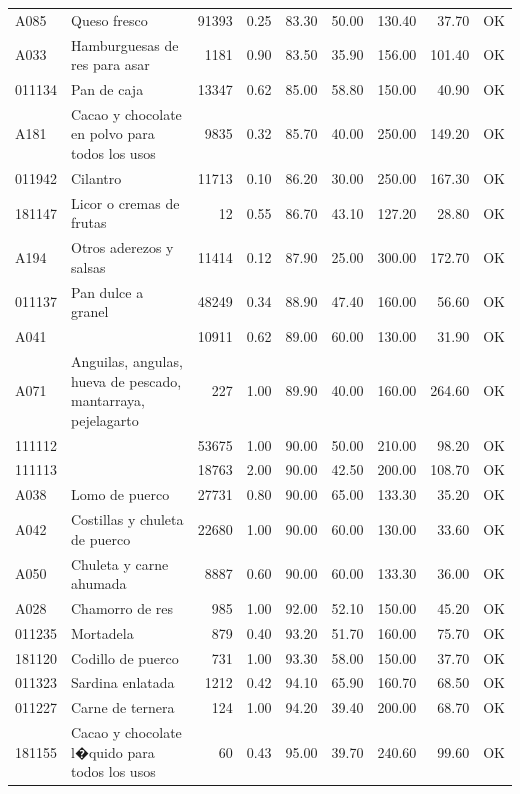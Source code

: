 \begin{table}[ht]
\begin{tabular}{llrrrrrrl}
  A085 & Queso fresco & 91393 & 0.25 & 83.30 & 50.00 & 130.40 & 37.70 & OK \\ 
  A033 & Hamburguesas de res para asar & 1181 & 0.90 & 83.50 & 35.90 & 156.00 & 101.40 & OK \\ 
  011134 & Pan de caja & 13347 & 0.62 & 85.00 & 58.80 & 150.00 & 40.90 & OK \\ 
  A181 & Cacao y chocolate en polvo para todos los usos & 9835 & 0.32 & 85.70 & 40.00 & 250.00 & 149.20 & OK \\ 
  011942 & Cilantro & 11713 & 0.10 & 86.20 & 30.00 & 250.00 & 167.30 & OK \\ 
  181147 & Licor o cremas de frutas &  12 & 0.55 & 86.70 & 43.10 & 127.20 & 28.80 & OK \\ 
  A194 & Otros aderezos y salsas & 11414 & 0.12 & 87.90 & 25.00 & 300.00 & 172.70 & OK \\ 
  011137 & Pan dulce a granel & 48249 & 0.34 & 88.90 & 47.40 & 160.00 & 56.60 & OK \\ 
  A041 &  & 10911 & 0.62 & 89.00 & 60.00 & 130.00 & 31.90 & OK \\ 
  A071 & Anguilas, angulas, hueva de pescado, mantarraya, pejelagarto & 227 & 1.00 & 89.90 & 40.00 & 160.00 & 264.60 & OK \\ 
  111112 &  & 53675 & 1.00 & 90.00 & 50.00 & 210.00 & 98.20 & OK \\ 
  111113 &  & 18763 & 2.00 & 90.00 & 42.50 & 200.00 & 108.70 & OK \\ 
  A038 & Lomo de puerco & 27731 & 0.80 & 90.00 & 65.00 & 133.30 & 35.20 & OK \\ 
  A042 & Costillas y chuleta de puerco & 22680 & 1.00 & 90.00 & 60.00 & 130.00 & 33.60 & OK \\ 
  A050 & Chuleta y carne ahumada & 8887 & 0.60 & 90.00 & 60.00 & 133.30 & 36.00 & OK \\ 
  A028 & Chamorro de res & 985 & 1.00 & 92.00 & 52.10 & 150.00 & 45.20 & OK \\ 
  011235 & Mortadela & 879 & 0.40 & 93.20 & 51.70 & 160.00 & 75.70 & OK \\ 
  181120 & Codillo de puerco & 731 & 1.00 & 93.30 & 58.00 & 150.00 & 37.70 & OK \\ 
  011323 & Sardina enlatada & 1212 & 0.42 & 94.10 & 65.90 & 160.70 & 68.50 & OK \\ 
  011227 & Carne de ternera & 124 & 1.00 & 94.20 & 39.40 & 200.00 & 68.70 & OK \\ 
  181155 & Cacao y chocolate l�quido para todos los usos &  60 & 0.43 & 95.00 & 39.70 & 240.60 & 99.60 & OK \\ 

\end{tabular}
\end{table}
